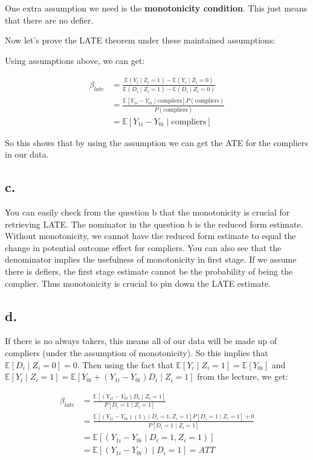 \documentclass[
  letterpaper,
  DIV=11,
  numbers=noendperiod]{scrartcl}
\begin{document}
One extra assumption we need is the \textbf{monotonicity condition}.
This just means that there are no defier.

Now let's prove the LATE theorem under these maintained assumptions:

Using assumptions above, we can get:

\begin{align}
  \beta_{late} &= \frac{\mathbb{E}(Y_i \mid Z_i = 1) - \mathbb{E}(Y_i \mid Z_i = 0)}{\mathbb{E}(D_i \mid Z_i = 1) - \mathbb{E}(D_i \mid Z_i = 0)}\\
   &= \frac{\mathbb{E}[Y_{1i} - Y_{0i} \mid \text{compliers}]P(\text{compliers})}{P(\text{compliers})}\\
   &= \mathbb{E}[Y_{1i} - Y_{0i} \mid \text{compliers}]
\end{align}

So this shows that by using the assumption we can get the ATE for the
compliers in our data.

\subsection{c.}\label{c.}

You can easily check from the question b that the monotonicity is
crucial for retrieving LATE. The nominator in the question b is the
reduced form estimate. Without monotonicity, we cannot have the reduced
form estimate to equal the change in potential outcome effect for
compliers. You can also see that the denominator implies the usefulness
of monotonicity in first stage. If we assume there is defiers, the first
stage estimate cannot be the probability of being the complier. Thus
monotonicity is crucial to pin down the LATE estimate.

\subsection{d.}\label{d.}

If there is no always takers, this means all of our data will be made up
of compliers (under the assumption of monotonicity). So this implies
that \(\mathbb{E} [D_i \mid Z_i = 0] = 0\). Then using the fact that
\(\mathbb{E}[Y_i \mid Z_i = 1] = \mathbb{E}[Y_{0i}]\) and
\(\mathbb{E}[Y_i \mid Z_i = 1] = \mathbb{E}[Y_{0i} + (Y_{1i} - Y_{0i}) D_i \mid Z_i = 1]\)
from the lecture, we get:

\begin{align}
 \beta_{late} &= \frac{\mathbb{E} [(Y_{1i}-Y_{0i}) D_i \mid Z_i = 1]}{P[D_i = 1 \mid Z_i =1]}\\
  &= \frac{\mathbb{E}[(Y_{1i} - Y_{0i}) (1) \mid D_i =1, Z_i =1] P[D_i = 1 \mid Z_i = 1]+ 0}{P[D_i = 1 \mid Z_i = 1]}\\
  &= \mathbb{E}[(Y_{1i} - Y_{0i} \mid D_i =1, Z_i = 1)]\\
  &= \mathbb{E}[(Y_{1i} - Y_{0i}) \mid D_i = 1] = ATT
\end{align}
\end{document}
